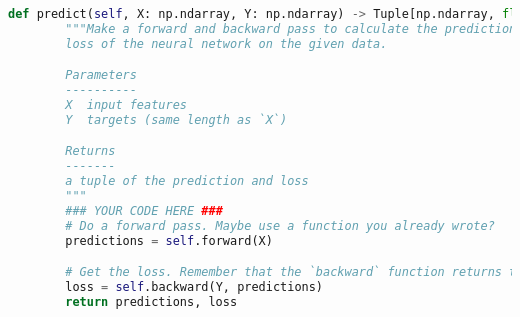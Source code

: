 \begin{lstlisting}[language=Python]
    def predict(self, X: np.ndarray, Y: np.ndarray) -> Tuple[np.ndarray, float]:
        """Make a forward and backward pass to calculate the predictions and
        loss of the neural network on the given data.

        Parameters
        ----------
        X  input features
        Y  targets (same length as `X`)

        Returns
        -------
        a tuple of the prediction and loss
        """
        ### YOUR CODE HERE ###
        # Do a forward pass. Maybe use a function you already wrote?
        predictions = self.forward(X)

        # Get the loss. Remember that the `backward` function returns the loss.
        loss = self.backward(Y, predictions)
        return predictions, loss

\end{lstlisting}

